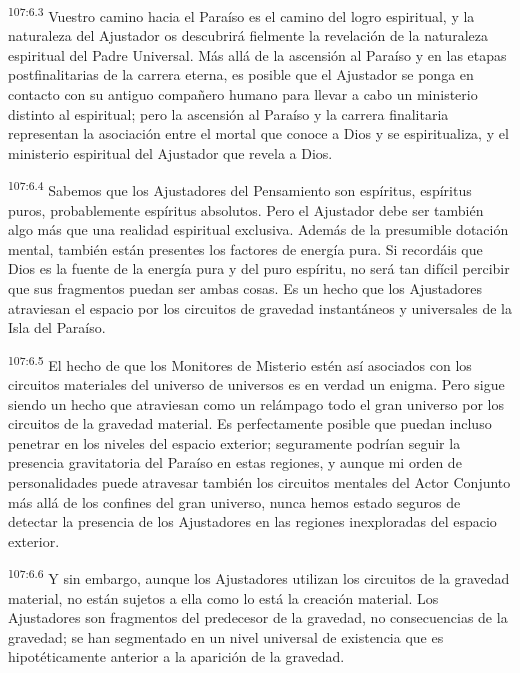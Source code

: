 \par
\textsuperscript{107:6.3} Vuestro camino hacia el Paraíso es el camino del logro espiritual, y la naturaleza del Ajustador os descubrirá fielmente la revelación de la naturaleza espiritual del Padre Universal. Más allá de la ascensión al Paraíso y en las etapas postfinalitarias de la carrera eterna, es posible que el Ajustador se ponga en contacto con su antiguo compañero humano para llevar a cabo un ministerio distinto al espiritual; pero la ascensión al Paraíso y la carrera finalitaria representan la asociación entre el mortal que conoce a Dios y se espiritualiza, y el ministerio espiritual del Ajustador que revela a Dios.

\par
\textsuperscript{107:6.4} Sabemos que los Ajustadores del Pensamiento son espíritus, espíritus puros, probablemente espíritus absolutos. Pero el Ajustador debe ser también algo más que una realidad espiritual exclusiva. Además de la presumible dotación mental, también están presentes los factores de energía pura. Si recordáis que Dios es la fuente de la energía pura y del puro espíritu, no será tan difícil percibir que sus fragmentos puedan ser ambas cosas. Es un hecho que los Ajustadores atraviesan el espacio por los circuitos de gravedad instantáneos y universales de la Isla del Paraíso.

\par
\textsuperscript{107:6.5} El hecho de que los Monitores de Misterio estén así asociados con los circuitos materiales del universo de universos es en verdad un enigma. Pero sigue siendo un hecho que atraviesan como un relámpago todo el gran universo por los circuitos de la gravedad material. Es perfectamente posible que puedan incluso penetrar en los niveles del espacio exterior; seguramente podrían seguir la presencia gravitatoria del Paraíso en estas regiones, y aunque mi orden de personalidades puede atravesar también los circuitos mentales del Actor Conjunto más allá de los confines del gran universo, nunca hemos estado seguros de detectar la presencia de los Ajustadores en las regiones inexploradas del espacio exterior.

\par
\textsuperscript{107:6.6} Y sin embargo, aunque los Ajustadores utilizan los circuitos de la gravedad material, no están sujetos a ella como lo está la creación material. Los Ajustadores son fragmentos del predecesor de la gravedad, no consecuencias de la gravedad; se han segmentado en un nivel universal de existencia que es hipotéticamente anterior a la aparición de la gravedad.

